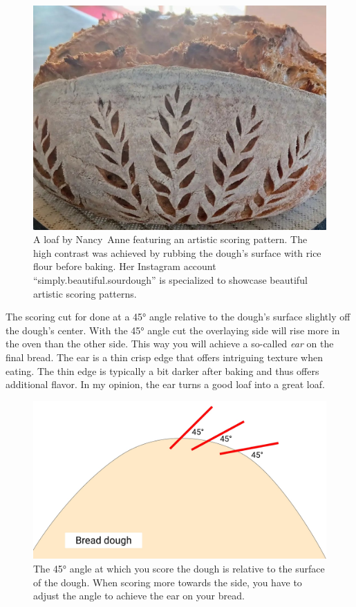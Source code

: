 \begin{figure}[htb!]
  \includegraphics[width=\textwidth]{artistic-scoring}
  \caption{A loaf by Nancy~Anne featuring an artistic scoring pattern.
  The high contrast was achieved by rubbing the
  dough's surface with rice flour before baking. Her Instagram
  account ``simply.beautiful.sourdough'' is specialized to showcase
  beautiful artistic scoring patterns.}%
  \label{fig:artistic-scoring}
\end{figure}

The scoring cut for done at a 45° angle relative to the dough's
surface slightly off the dough's center. With the 45° angle cut
the overlaying side will rise more in the oven than the other side.
This way you will achieve a so-called \emph{ear} on the final bread.
The ear is a thin crisp edge that offers intriguing texture
when eating. The thin edge is typically a bit darker after baking
and thus offers additional flavor. In my opinion, the ear turns
a good loaf into a great loaf.

\begin{figure}[htb!]
  \includegraphics[width=\textwidth]{bread-scoring-angle}
  \caption{The 45° angle at which you score the dough is relative to the surface of the dough.
  When scoring more towards the side, you have to adjust the angle to achieve the ear on your
  bread.}%
  \label{fig:scoring-angle}
\end{figure}

